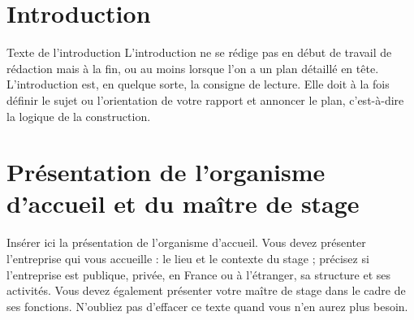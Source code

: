 \chapter*{Introduction}

Texte de l'introduction
L’introduction ne se rédige pas en début de travail de rédaction mais à la fin, ou au moins lorsque l’on a un plan détaillé en tête.
L’introduction est, en quelque sorte, la consigne de lecture. Elle doit à la fois définir le sujet ou l’orientation de votre rapport et annoncer le plan, c’est-à-dire la logique de la construction.


\chapter*{Présentation de l’organisme d’accueil et du maître de stage}

Insérer ici la présentation de l’organisme d’accueil.
Vous devez présenter l’entreprise qui vous accueille : le lieu et le contexte du stage ; précisez si l’entreprise est publique, privée, en France ou à l’étranger, sa structure et ses activités. Vous devez également présenter votre maître de stage dans le cadre de ses fonctions.
N’oubliez pas d’effacer ce texte quand vous n’en aurez plus besoin.
